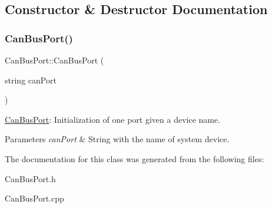\subsection{Constructor \& Destructor Documentation}
\mbox{\label{classCanBusPort_ad4649a2da594bbffc267483646fb1405}} 
\subsubsection{\texorpdfstring{Can\+Bus\+Port()}{CanBusPort()}}
{\footnotesize\ttfamily Can\+Bus\+Port\+::\+Can\+Bus\+Port (\begin{DoxyParamCaption}\item[{string}]{can\+Port }\end{DoxyParamCaption})}



\hyperlink{classCanBusPort}{Can\+Bus\+Port}\+: Initialization of one port given a device name. 


\begin{DoxyParams}{Parameters}
{\em can\+Port} & String with the name of system device. \\
\hline
\end{DoxyParams}


The documentation for this class was generated from the following files\+:\begin{DoxyCompactItemize}
\item 
Can\+Bus\+Port.\+h\item 
Can\+Bus\+Port.\+cpp\end{DoxyCompactItemize}
